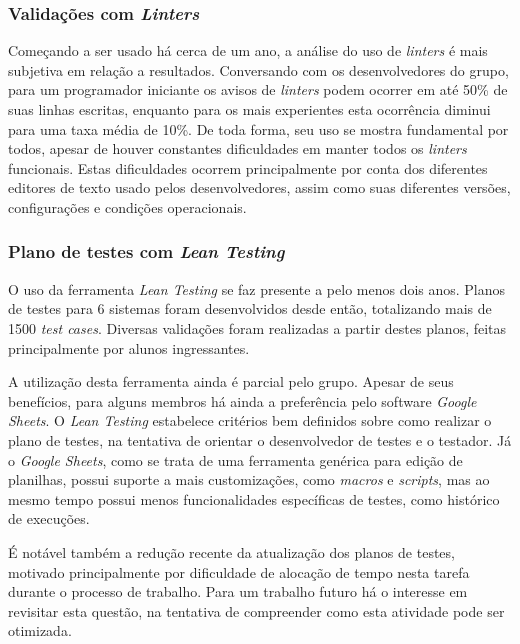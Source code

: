 \hypertarget{validacao-com-linters}{%
\subsubsection{\texorpdfstring{Validações com \emph{Linters}}{Validações com Linters}}\label{validacao-com-linters}}

Começando a ser usado há cerca de um ano, a análise do uso de \emph{linters} é mais subjetiva em relação a resultados. Conversando com os desenvolvedores do grupo, para um programador iniciante os avisos de \emph{linters} podem ocorrer em até 50\% de suas linhas escritas, enquanto para os mais experientes esta ocorrência diminui para uma taxa média de 10\%. De toda forma, seu uso se mostra fundamental por todos, apesar de houver constantes dificuldades em manter todos os \emph{linters} funcionais. Estas dificuldades ocorrem principalmente por conta dos diferentes editores de texto usado pelos desenvolvedores, assim como suas diferentes versões, configurações e condições operacionais.

\hypertarget{plano-de-testes-com-lean-testing}{%
\subsubsection{\texorpdfstring{Plano de testes com \emph{Lean Testing}}{Plano de testes com Lean Testing}}\label{plano-de-testes-com-lean-testing}}

O uso da ferramenta \emph{Lean Testing} se faz presente a pelo menos dois anos. Planos de testes para 6 sistemas foram desenvolvidos desde então, totalizando mais de 1500 \emph{test cases}. Diversas validações foram realizadas a partir destes planos, feitas principalmente por alunos ingressantes.

A utilização desta ferramenta ainda é parcial pelo grupo. Apesar de seus benefícios, para alguns membros há ainda a preferência pelo software \emph{Google Sheets}. O \emph{Lean Testing} estabelece critérios bem definidos sobre como realizar o plano de testes, na tentativa de orientar o desenvolvedor de testes e o testador. Já o \emph{Google Sheets}, como se trata de uma ferramenta genérica para edição de planilhas, possui suporte a mais customizações, como \emph{macros} e \emph{scripts}, mas ao mesmo tempo possui menos funcionalidades específicas de testes, como histórico de execuções.

É notável também a redução recente da atualização dos planos de testes, motivado principalmente por dificuldade de alocação de tempo nesta tarefa durante o processo de trabalho. Para um trabalho futuro há o interesse em revisitar esta questão, na tentativa de compreender como esta atividade pode ser otimizada.

